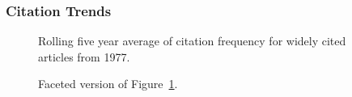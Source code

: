 \documentclass[
  10pt,
  letterpaper,
  DIV=11,
  numbers=noendperiod,
  twoside]{scrartcl}
\begin{document}
\subsubsection*{Citation Trends}\label{citation-trends-1}

\begin{figure}


\caption{\label{fig-citation-spaghetti-1977}Rolling five year average of
citation frequency for widely cited articles from 1977.}

\end{figure}%

\begin{figure}


\caption{\label{fig-citation-facet-1977}Faceted version of
Figure~\ref{fig-citation-spaghetti-1977}.}

\end{figure}%
\end{document}
